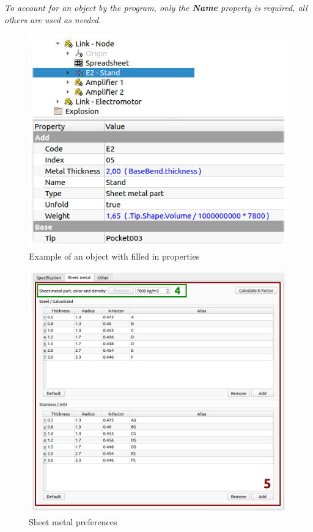\documentclass[a4paper,12pt]{article}
\begin{document}
\begin{center}\emph{To account for an object by the program, only the \textbf{Name} property is required, all others are used as needed.}\end{center}

\begin{figure}[htp]
	\centering
	\includegraphics[scale=1]{img/properties.png}
	\caption{Example of an object with filled in properties}
	\label{sec:properties}
\end{figure}

\pagebreak

\begin{figure}[htp]
	\centering
	\includegraphics[width=1\textwidth]{img/pref_sm.png}
	\caption{Sheet metal preferences}
	\label{sec:pref_sm}
\end{figure}
\end{document}
